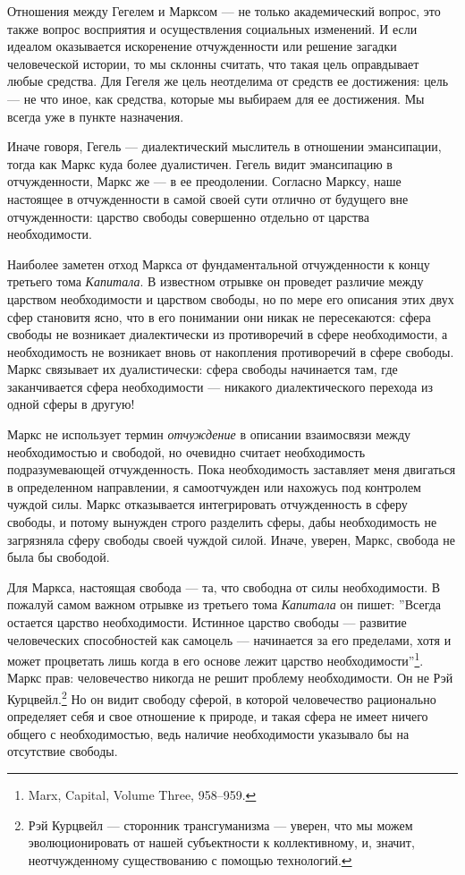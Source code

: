 \documentclass[12pt]{book}
\begin{document}
Отношения между Гегелем и Марксом --- не только академический вопрос, это также вопрос восприятия и осуществления социальных изменений. И если идеалом оказывается искоренение отчужденности или решение загадки человеческой истории, то мы склонны считать, что такая цель оправдывает любые средства. Для Гегеля же цель неотделима от средств ее достижения: цель --- не что иное, как средства, которые мы выбираем для ее достижения. Мы всегда уже в пункте назначения.

Иначе говоря, Гегель --- диалектический мыслитель в отношении эмансипации, тогда как Маркс куда более дуалистичен. Гегель видит эмансипацию в отчужденности, Маркс же --- в ее преодолении. Согласно Марксу, наше настоящее в отчужденности в самой своей сути отлично от будущего вне отчужденности: царство свободы совершенно отдельно от царства необходимости.

Наиболее заметен отход Маркса от фундаментальной отчужденности к концу третьего тома \textit{Капитала}. В известном отрывке он проведет различие между царством необходимости и царством свободы, но по мере его описания этих двух сфер становитя ясно, что в его понимании они никак не пересекаются: сфера свободы не возникает диалектически из противоречий в сфере необходимости, а необходимость не возникает вновь от накопления противоречий в сфере свободы. Маркс связывает их дуалистически: сфера свободы начинается там, где заканчивается сфера необходимости --- никакого диалектического перехода из одной сферы в другую!

Маркс не использует термин \textit{отчуждение} в описании взаимосвязи между необходимостью и свободой, но очевидно считает необходимость подразумевающей отчужденность. Пока необходимость заставляет меня двигаться в определенном направлении, я самоотчужден или нахожусь под контролем чуждой силы. Маркс отказывается интегрировать отчужденность в сферу свободы, и потому вынужден строго разделить сферы, дабы необходимость не загрязняла сферу свободы своей чуждой силой. Иначе, уверен, Маркс, свобода не была бы свободой.

Для Маркса, настоящая свобода --- та, что свободна от силы необходимости. В пожалуй самом важном отрывке из третьего тома \textit{Капитала} он пишет: ''Всегда остается царство необходимости. Истинное царство свободы --- развитие человеческих способностей как самоцель --- начинается за его пределами, хотя и может процветать лишь когда в его основе лежит царство необходимости''\footnote{Marx, Capital, Volume Three, 958–959.}. Маркс прав: человечество никогда не решит проблему необходимости. Он не Рэй Курцвейл.\footnote{Рэй Курцвейл --- сторонник трансгуманизма --- уверен, что мы можем эволюционировать от нашей субъектности к коллективному, и, значит, неотчужденному существованию с помощью технологий.} Но он видит свободу сферой, в которой человечество рационально определяет себя и свое отношение к природе, и такая сфера не имеет ничего общего с необходимостью, ведь наличие необходимости указывало бы на отсутствие свободы.
\end{document}
